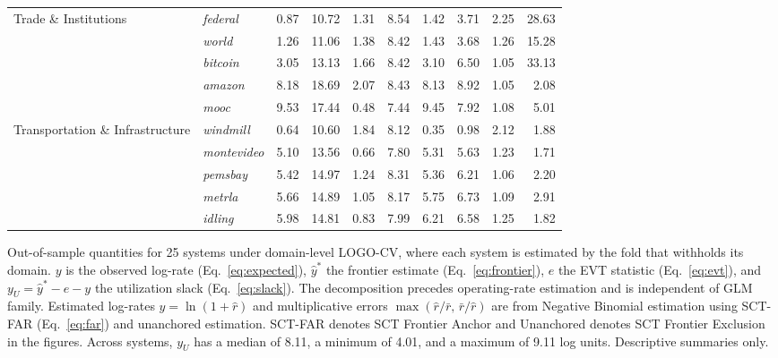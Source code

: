 \documentclass{article}
\begin{document}
\begin{table}[H]
\begin{tabularx}{\linewidth}{@{}Xlrrrrrrrr@{}}
\addlinespace
Trade \& Institutions & \textit{federal} & 0.87 & 10.72 & 1.31 & 8.54 & 1.42 & 3.71 & 2.25 & 28.63 \\
 & \textit{world} & 1.26 & 11.06 & 1.38 & 8.42 & 1.43 & 3.68 & 1.26 & 15.28 \\
 & \textit{bitcoin} & 3.05 & 13.13 & 1.66 & 8.42 & 3.10 & 6.50 & 1.05 & 33.13 \\
 & \textit{amazon} & 8.18 & 18.69 & 2.07 & 8.43 & 8.13 & 8.92 & 1.05 & 2.08 \\
 & \textit{mooc} & 9.53 & 17.44 & 0.48 & 7.44 & 9.45 & 7.92 & 1.08 & 5.01 \\
\addlinespace
Transportation \& Infrastructure & \textit{windmill} & 0.64 & 10.60 & 1.84 & 8.12 & 0.35 & 0.98 & 2.12 & 1.88 \\
 & \textit{montevideo} & 5.10 & 13.56 & 0.66 & 7.80 & 5.31 & 5.63 & 1.23 & 1.71 \\
 & \textit{pemsbay} & 5.42 & 14.97 & 1.24 & 8.31 & 5.36 & 6.21 & 1.06 & 2.20 \\
 & \textit{metrla} & 5.66 & 14.89 & 1.05 & 8.17 & 5.75 & 6.73 & 1.09 & 2.91 \\
 & \textit{idling} & 5.98 & 14.81 & 0.83 & 7.99 & 6.21 & 6.58 & 1.25 & 1.82 \\
\bottomrule
\end{tabularx}
\par\vspace{12pt}
\begin{minipage}{\linewidth}
\footnotesize
Out-of-sample quantities for 25 systems under domain-level LOGO-CV, where each system is estimated by the fold that withholds its domain. $y$ is the observed log-rate (Eq.~\eqref{eq:expected}), $\widehat{y}^{*}$ the frontier estimate (Eq.~\eqref{eq:frontier}), $e$ the EVT statistic (Eq.~\eqref{eq:evt}), and $y_U = \widehat{y}^{*} - e - y$ the utilization slack (Eq.~\eqref{eq:slack}). The decomposition precedes operating-rate estimation and is independent of GLM family. Estimated log-rates $\widehat{y} = \ln(1 + \widehat{r})$ and multiplicative errors $\max(\widehat{r}/\bar{r},\, \bar{r}/\widehat{r})$ are from Negative Binomial estimation using SCT-FAR (Eq.~\eqref{eq:far}) and unanchored estimation. SCT-FAR denotes SCT Frontier Anchor and Unanchored denotes SCT Frontier Exclusion in the figures. Across systems, $y_U$ has a median of 8.11, a minimum of 4.01, and a maximum of 9.11 log units. Descriptive summaries only.
\end{minipage}
\end{table}
\end{document}

